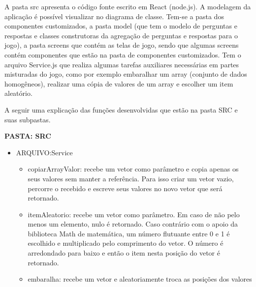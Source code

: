 A pasta src apresenta o código fonte escrito em React (node.js).
A modelagem da aplicação é possível visualizar no diagrama de classe. Tem-se a pasta dos componentes customizados, a pasta model (que tem o modelo de perguntas e respostas e classes construtoras da agregação de perguntas e respostas para o jogo),  a pasta screens que contém as telas de jogo, sendo que algumas screens contém componentes que estão na pasta de componentes customizados. Tem o arquivo Service.js que realiza algumas tarefas auxiliares necessárias em partes misturadas do jogo, como por exemplo embaralhar um array (conjunto de dados homogêneos), realizar uma cópia de valores de um array e escolher um item aleatório.

A seguir uma explicação das funções desenvolvidas que estão na pasta SRC e suas subpastas.

\textbf{PASTA: SRC}
\begin{itemize}
\item ARQUIVO:Service
	\begin{itemize}
		\item copiarArrayValor: recebe um vetor como parâmetro e copia apenas os seus valores sem manter a referência. Para isso criar um vetor vazio, percorre o recebido e escreve seus valores no novo vetor que será retornado.

		\item itemAleatorio: recebe um vetor como parâmetro. Em caso de não pelo menos um elemento, nulo é retornado. Caso contrário com o apoio da biblioteca Math de matemática, um número flutuante entre 0 e 1 é escolhido e multiplicado pelo comprimento do vetor. O número é arredondado para baixo e então o item nesta posição do vetor é retornado.

		\item embaralha: recebe um vetor e aleatoriamente troca as posições dos valores

	\end{itemize}
\end{itemize}


